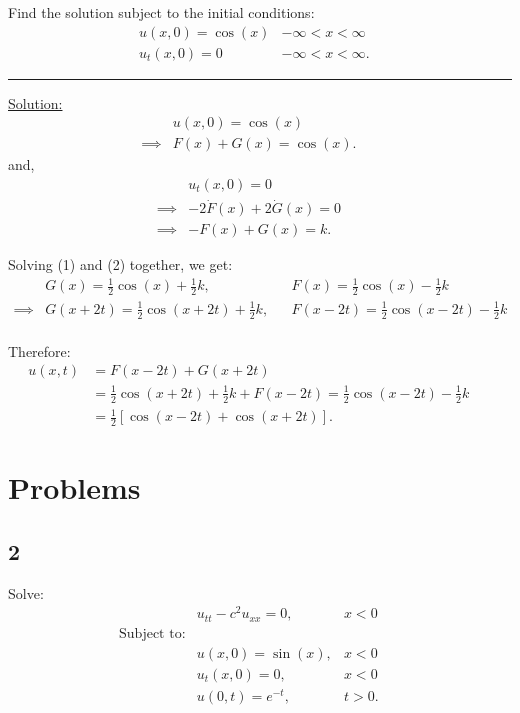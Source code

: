 \documentclass{article}
\begin{document}
Find the solution subject to the initial conditions:
\begin{align*}
  &u(x,0)=\cos(x) & -\infty < x < \infty &&\\
  &u_t(x,0)=0 & -\infty < x < \infty.
\end{align*}

\begin{center}
  \noindent\rule{8cm}{0.4pt}
\end{center}

\underline{Solution:}
\begin{align}
  &u(x,0) = \cos(x) \nonumber &&\\
  \implies& F(x) + G(x) = \cos(x).
\end{align}
and,
\begin{align}
  &u_t(x,0) = 0 \nonumber &&\\
  \implies&-2\dot{F}(x) + 2\dot{G}(x) = 0 \nonumber &&\\
  \implies& -F(x) + G(x) = k.
\end{align}

Solving (1) and (2) together, we get:
\begin{align*}
  &G(x) = \frac{1}{2} \cos(x) + \frac{1}{2} k,
  && F(x) = \frac{1}{2} \cos(x) - \frac{1}{2} k &&\\
  \implies&G(x+2t) = \frac{1}{2} \cos(x+2t) + \frac{1}{2} k,
  && F(x-2t) = \frac{1}{2} \cos(x-2t) - \frac{1}{2} k &&\\
\end{align*}

Therefore:
\begin{align*}
  u(x,t) &= F(x-2t) + G(x+2t) &&\\
  &= \frac{1}{2} \cos(x+2t) + \frac{1}{2} k
  + F(x-2t) = \frac{1}{2} \cos(x-2t) - \frac{1}{2} k &&\\
  &=\frac{1}{2} [\cos(x-2t) + \cos(x+2t)].
\end{align*}

\newpage

\section*{Problems}
\subsection*{2}
Solve:
\begin{align*}
  &u_{tt} - c^2 u_{xx} = 0, &x < 0 &&\\
  \text{Subject to:} \\
  &u(x,0) = \sin(x), &x < 0 &&\\
  &u_t(x,0) = 0, &x < 0 &&\\
  &u(0,t) = e^{-t}, &t > 0.
\end{align*}
\end{document}
